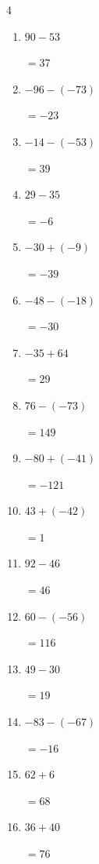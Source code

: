 \begin{multicols}{4}
\begin{enumerate}
  \itemsep=1pt
  \item $90-53$

        $=37$

  \item $-96-(-73)$

        $=-23$

  \item $-14-(-53)$

        $=39$

  \item $29-35$

        $=-6$

  \item $-30+(-9)$

        $=-39$

  \item $-48-(-18)$

        $=-30$

  \item $-35+64$

        $=29$

  \item $76-(-73)$

        $=149$

  \item $-80+(-41)$

        $=-121$

  \item $43+(-42)$

        $=1$

  \item $92-46$

        $=46$

  \item $60-(-56)$

        $=116$

  \item $49-30$

        $=19$

  \item $-83-(-67)$

        $=-16$

  \item $62+6$

        $=68$

  \item $36+40$

        $=76$


\end{enumerate}
\end{multicols}
